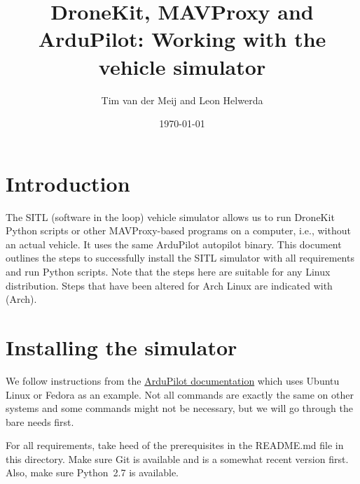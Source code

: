 \documentclass{article}
\newcommand{\arch}{{\color{red} (Arch)}}
\begin{document}
\title{DroneKit, MAVProxy and ArduPilot: Working with the vehicle simulator}
\author{Tim van der Meij and Leon Helwerda}
\date{\today}

\maketitle

\section{Introduction}
The SITL (software in the loop) vehicle simulator allows us to run DroneKit 
Python scripts or other MAVProxy-based programs on a computer, i.e., without an 
actual vehicle. It uses the same ArduPilot autopilot binary. This document 
outlines the steps to successfully install the SITL simulator with all 
requirements and run Python scripts. Note that the steps here are suitable for 
any Linux distribution. Steps that have been altered for Arch Linux are 
indicated with \arch{}.

\section{Installing the simulator}
We follow instructions from the 
\href{http://ardupilot.org/dev/docs/setting-up-sitl-on-linux.html}{ArduPilot 
documentation} which uses Ubuntu Linux or Fedora as an example. Not all 
commands are exactly the same on other systems and some commands might not be 
necessary, but we will go through the bare needs first.

For all requirements, take heed of the prerequisites in the README.md file in 
this directory. Make sure Git is available and is a somewhat recent version 
first. Also, make sure Python~2.7 is available.
\end{document}
